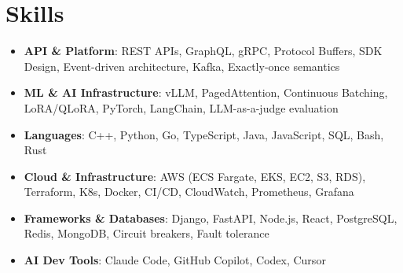 \documentclass[letterpaper,11pt]{article}
\newcommand{\resumeSubHeadingListStart}{\begin{itemize}[leftmargin=0.15in, label={}]}
\newcommand{\resumeSubHeadingListEnd}{\end{itemize}}
\newcommand{\resumeSkillHeading}[2]{%
  \item\small{\textbf{#1}: #2 \vspace{-9pt}}%
}
\begin{document}
\section{Skills}
  \resumeSubHeadingListStart
    \resumeSkillHeading{API \& Platform}{REST APIs, GraphQL, gRPC, Protocol Buffers, SDK Design, Event-driven architecture, Kafka, Exactly-once semantics}
    \resumeSkillHeading{ML \& AI Infrastructure}{vLLM, PagedAttention, Continuous Batching, LoRA/QLoRA, PyTorch, LangChain, LLM-as-a-judge evaluation}
    \resumeSkillHeading{Languages}{C++, Python, Go, TypeScript, Java, JavaScript, SQL, Bash, Rust}
    \resumeSkillHeading{Cloud \& Infrastructure}{AWS (ECS Fargate, EKS, EC2, S3, RDS), Terraform, K8s, Docker, CI/CD, CloudWatch, Prometheus, Grafana}
    \resumeSkillHeading{Frameworks \& Databases}{Django, FastAPI, Node.js, React, PostgreSQL, Redis, MongoDB, Circuit breakers, Fault tolerance}
    \resumeSkillHeading{AI Dev Tools}{Claude Code, GitHub Copilot, Codex, Cursor}
  \resumeSubHeadingListEnd
\end{document}
